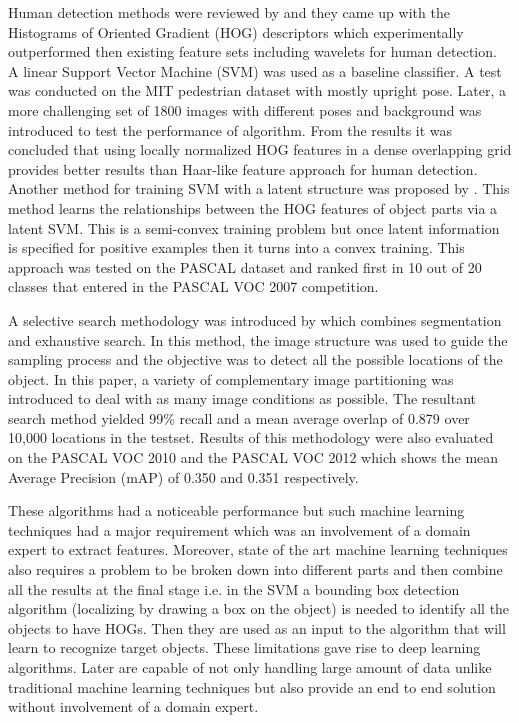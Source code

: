 \documentclass[11pt]{article}
\begin{document}
Human detection methods were reviewed by \cite{dalal2005histograms} and they came up with the Histograms of Oriented Gradient (HOG) descriptors which experimentally outperformed then existing feature sets including wavelets for human detection. A linear Support Vector Machine (SVM) was used as a baseline classifier. A test was conducted on the MIT pedestrian dataset with mostly upright pose. Later, a more challenging set of 1800 images with different poses and background was introduced to test the performance of algorithm. From the results it was concluded that using locally normalized HOG features in a dense overlapping grid provides better results than Haar-like feature approach for human detection. Another method for training SVM with a latent structure was proposed by \cite{felzenszwalb2008discriminatively}. This method learns the relationships between the HOG features of object parts via a latent SVM. This is a semi-convex training problem but once latent information is specified for positive examples then it turns into a convex training. This approach was tested on the PASCAL dataset and ranked first in 10 out of 20 classes that entered in the PASCAL VOC 2007 competition.

A selective search methodology was introduced by \cite{uijlings2013selective} which combines segmentation and exhaustive search. In this method, the image structure was used to guide the sampling process and the objective was to detect all the possible locations of the object. In this paper, a variety of complementary image partitioning was introduced to deal with as many image conditions as possible. The resultant search method yielded 99\% recall and a mean average overlap of 0.879 over 10,000 locations in the testset. Results of this methodology were also evaluated on the PASCAL VOC 2010 and the PASCAL VOC 2012 which shows the mean Average Precision (mAP) of 0.350 and 0.351 respectively.

These algorithms had a noticeable performance but such machine learning techniques had a major requirement which was an involvement of a domain expert to extract features. Moreover, state of the art machine learning techniques also requires a problem to be broken down into different parts and then combine all the results at the final stage i.e. in the SVM a bounding box detection algorithm (localizing by drawing a box on the object) is needed to identify all the objects to have HOGs. Then they are used as an input to the algorithm that will learn to recognize target objects. These limitations gave rise to deep learning algorithms. Later are capable of not only handling large amount of data unlike traditional machine learning techniques but also provide an end to end solution without involvement of a domain expert.
\end{document}

